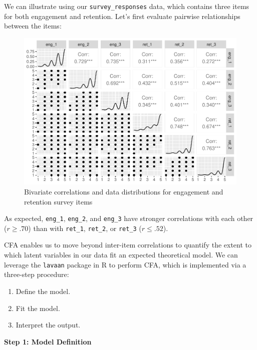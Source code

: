 \documentclass[
]{book}
\providecommand{\tightlist}{%
  \setlength{\itemsep}{0pt}\setlength{\parskip}{0pt}}
\begin{document}
We can illustrate using our \texttt{survey\_responses} data, which contains three items for both engagement and retention. Let's first evaluate pairwise relationships between the items:

\begin{figure}

{\centering \includegraphics[width=1\linewidth]{The_Fundamentals_of_People_Analytics_files/figure-latex/ggpairs-eng-ret-1} 

}

\caption{Bivariate correlations and data distributions for engagement and retention survey items}\label{fig:ggpairs-eng-ret}
\end{figure}

As expected, \texttt{eng\_1}, \texttt{eng\_2}, and \texttt{eng\_3} have stronger correlations with each other (\(r \ge .70\)) than with \texttt{ret\_1}, \texttt{ret\_2}, or \texttt{ret\_3} (\(r \le .52\)).

CFA enables us to move beyond inter-item correlations to quantify the extent to which latent variables in our data fit an expected theoretical model. We can leverage the \texttt{lavaan} package in R to perform CFA, which is implemented via a three-step procedure:

\begin{enumerate}
\def\labelenumi{\arabic{enumi}.}
\tightlist
\item
  Define the model.
\item
  Fit the model.
\item
  Interpret the output.
\end{enumerate}

\textbf{Step 1: Model Definition}
\end{document}
